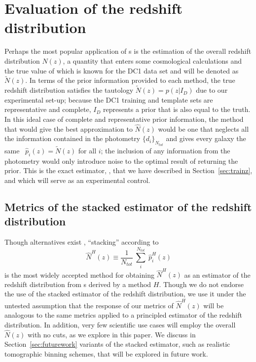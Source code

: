 \appendix

\section{Evaluation of the redshift distribution}
\label{sec:moments}

Perhaps the most popular application of \pzpdf s is the estimation of the overall redshift distribution $N(z)$, a quantity that enters some cosmological calculations and the true value of which is known for the DC1 data set and will be denoted as $\tilde{N}(z)$.
In terms of the prior information provided to each method, the true redshift distribution satisfies the tautology $\tilde{N}(z) = p(z \vert I_{D})$ due to our experimental set-up; because the DC1 training and template sets are representative and complete, $I_{D}$ represents a prior that is also equal to the truth.
In this ideal case of complete and representative prior information, the method that would give the best approximation to $\hat{N}(z)$ would be one that neglects all the information contained in the photometry $\{d_{i}\}_{N_{tot}}$ and gives every galaxy the same \pzpdf\ $\hat{p}_{i}(z) = \tilde{N}(z)$ for all $i$; the inclusion of any information from the photometry would only introduce noise to the optimal result of returning the prior.
This is the exact estimator, \trainz, that we have described in Section~\ref{sec:trainz}, and which will serve as an experimental control.

\subsection{Metrics of the stacked estimator of the redshift distribution}
\label{sec:stackedmetrics}

Though alternatives exist \citep{Malz:chippr}, ``stacking'' according to
\begin{equation}
  \label{eq:stacked}
  \hat{N}^{H}(z) \equiv \frac{1}{N_{tot}}\ \sum_{i}^{N_{tot}}\ \hat{p}^{H}_{i}(z)
\end{equation}
is the most widely accepted method for obtaining $\hat{N}^{H}(z)$ as an estimator of the redshift distribution from \pzpdf s derived by a method $H$.
Though we do not endorse the use of the stacked estimator of the redshift distribution, we use it under the untested assumption that the response of our metrics of $\hat{N}^{H}(z)$ will be analogous to the same metrics applied to a principled estimator of the redshift distribution.
In addition, very few scientific use cases will employ the overall $\hat{N}(z)$ with no cuts, as we explore in this paper.
We discuss in Section~\ref{sec:futurework} variants of the stacked estimator, such as realistic tomographic binning schemes, that will be explored in future work.

